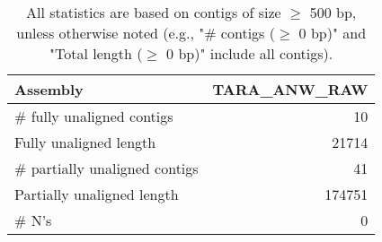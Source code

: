 \documentclass[12pt,a4paper]{article}
\begin{document}
\begin{table}[ht]
\begin{center}
\caption{All statistics are based on contigs of size $\geq$ 500 bp, unless otherwise noted (e.g., "\# contigs ($\geq$ 0 bp)" and "Total length ($\geq$ 0 bp)" include all contigs).}
\begin{tabular}{|l*{1}{|r}|}
\hline
Assembly & TARA\_ANW\_RAW \\ \hline
\# fully unaligned contigs & 10 \\ \hline
Fully unaligned length & 21714 \\ \hline
\# partially unaligned contigs & 41 \\ \hline
Partially unaligned length & 174751 \\ \hline
\# N's & 0 \\ \hline
\end{tabular}
\end{center}
\end{table}
\end{document}
